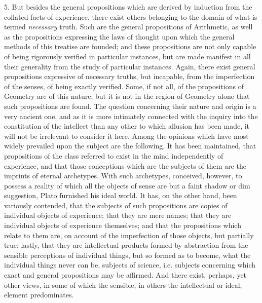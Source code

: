 \documentclass[oneside]{book}
\begin{document}
5. But besides the general propositions which are derived by
induction from the collated facts of experience, there exist others
belonging to the domain of what is termed \emph{necessary} truth. Such
are the general propositions of Arithmetic, as well as the propositions expressing the laws of thought upon which the general
methods of this treatise are founded; and these propositions
are not only capable of being rigorously verified in particular
instances, but are made manifest in all their generality from the
study of particular instances. Again, there exist general propositions expressive of necessary truths, but incapable, from the
imperfection of the senses, of being exactly verified. Some, if
not all, of the propositions of Geometry are of this nature; but
it is not in the region of Geometry alone that such propositions
are found. The question concerning their nature and origin
is a very ancient one, and as it is more intimately connected
with the inquiry into the constitution of the intellect than any
other to which allusion has been made, it will not be irrelevant
to consider it here. Among the opinions which have most
widely prevailed upon the subject are the following. It has
been maintained, that propositions of the class referred to exist
in the mind independently of experience, and that those conceptions which are the subjects of them are the imprints of eternal
archetypes. With such archetypes, conceived, however, to possess a reality of which all the objects of sense are but a faint
shadow or dim suggestion, Plato furnished his ideal world. It
has, on the other hand, been variously contended, that the
subjects of such propositions are copies of individual objects of
experience; that they are mere names; that they are individual
objects of experience themselves; and that the propositions which
relate to them are, on account of the imperfection of those objects,
but partially true; lastly, that they are intellectual products
formed by abstraction from the sensible perceptions of individual
things, but so formed as to become, what the individual things
never can be, subjects of science, i.e. subjects concerning which
exact and general propositions may be affirmed. And there exist, perhaps, yet other views, in some of which the sensible, in
others the intellectual or ideal, element predominates.
\end{document}

